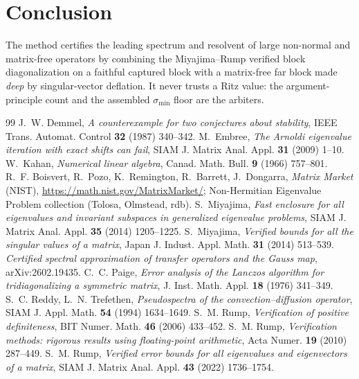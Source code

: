 \documentclass[11pt]{article}
\newcommand{\sigmin}{\sigma_{\min}}
\begin{document}
\section{Conclusion}\label{sec:conclusion}

The method certifies the leading spectrum and resolvent of large non-normal and matrix-free operators
by combining the Miyajima--Rump verified block diagonalization on a faithful captured block with a
matrix-free far block made \emph{deep} by singular-vector deflation. It never trusts a Ritz value:
the argument-principle count and the assembled $\sigmin$ floor are the arbiters.

\begin{thebibliography}{99}
 J.~W. Demmel, \emph{A counterexample for two conjectures about stability},
  IEEE Trans. Automat. Control \textbf{32} (1987) 340--342.
 M.~Embree, \emph{The Arnoldi eigenvalue iteration with exact shifts can fail},
  SIAM J. Matrix Anal. Appl. \textbf{31} (2009) 1--10.
 W.~Kahan, \emph{Numerical linear algebra}, Canad. Math. Bull. \textbf{9} (1966)
  757--801.
 R.~F. Boisvert, R.~Pozo, K.~Remington, R.~Barrett, J.~Dongarra, \emph{Matrix
  Market} (NIST), \url{https://math.nist.gov/MatrixMarket/}; Non-Hermitian Eigenvalue Problem
  collection (Tolosa, Olmstead, rdb).
 S.~Miyajima, \emph{Fast enclosure for all eigenvalues and invariant subspaces
  in generalized eigenvalue problems}, SIAM J. Matrix Anal. Appl. \textbf{35} (2014) 1205--1225.
 S.~Miyajima, \emph{Verified bounds for all the singular values of a matrix},
  Japan J. Indust. Appl. Math. \textbf{31} (2014) 513--539.
 \emph{Certified spectral approximation of transfer operators and the Gauss
  map}, arXiv:2602.19435.
 C.~C. Paige, \emph{Error analysis of the Lanczos algorithm for tridiagonalizing a
  symmetric matrix}, J. Inst. Math. Appl. \textbf{18} (1976) 341--349.
 S.~C. Reddy, L.~N. Trefethen, \emph{Pseudospectra of the
  convection--diffusion operator}, SIAM J. Appl. Math. \textbf{54} (1994) 1634--1649.
 S.~M. Rump, \emph{Verification of positive definiteness}, BIT Numer. Math.
  \textbf{46} (2006) 433--452.
 S.~M. Rump, \emph{Verification methods: rigorous results using floating-point
  arithmetic}, Acta Numer. \textbf{19} (2010) 287--449.
 S.~M. Rump, \emph{Verified error bounds for all eigenvalues and eigenvectors of a
  matrix}, SIAM J. Matrix Anal. Appl. \textbf{43} (2022) 1736--1754. %

\end{thebibliography}
\end{document}
